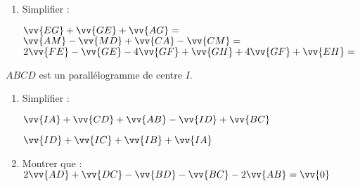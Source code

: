 \documentclass[a4paper,12pt]{article}
\begin{document}
\begin{exo}[3]
\begin{enumerate}
\item Simplifier :

\(\vv{EG}+\vv{GE}+\vv{AG}= \)\anserline[2]
\(\vv{AM}-\vv{MD}+\vv{CA}-\vv{CM}= \)\anserline[2]
\(2\vv{FE}-\vv{GE}-4\vv{GF}+\vv{GH}+4\vv{GF}+\vv{EH}= \)\anserline[2]
\end{enumerate}
\end{exo}

\begin{exo}[3]
$ABCD$ est un parallélogramme de centre $I$.
\begin{enumerate}
\item Simplifier :
\begin{multicols}{2}
$\vv{IA}+\vv{CD}+\vv{AB}-\vv{ID}+\vv{BC}$

\anserline[5]
\columnbreak

$\vv{ID}+\vv{IC}+\vv{IB}+\vv{IA}$

\anserline[5]
\end{multicols}
\item Montrer que : $2\vv{AD}+\vv{DC}-\vv{BD}-\vv{BC}-2\vv{AB}=\vv{0}$

\anserline[10]
\end{enumerate}
\end{exo}
\end{document}

